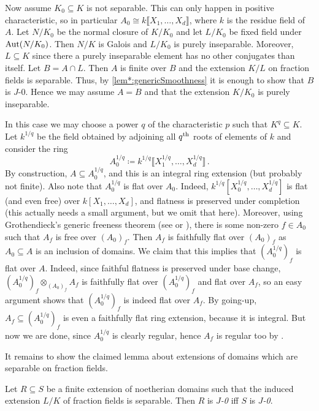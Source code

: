 \begin{proof*}
	Now assume $K_0\subseteq K$ is not separable. This can only happen in positive characteristic, so in particular $A_0\cong k\llbracket X_1,\dotsc,X_d\rrbracket$, where $k$ is the residue field of $A$. Let $N/K_0$ be the normal closure of $K/K_0$ and let $L/K_0$ be fixed field under $\operatorname{Aut}(N/K_0)$. Then $N/K$ is Galois and $L/K_0$ is purely inseparable. Moreover, $L\subseteq K$ since there a purely inseparable element has no other conjugates than itself. Let $B=A\cap L$. Then $A$ is finite over $B$ and the extension $K/L$ on fraction fields is separable. Thus, by \cref{lem*:genericSmoothness} it is enough to show that $B$ is $J$-0. Hence we may assume $A=B$ and that the extension $K/K_0$ is purely inseparable.
	
	In this case we may choose a power $q$ of the characteristic $p$ such that $K^q\subseteq K$. Let $k^{1/q}$ be the field obtained by adjoining all $q^{\text{th}}$ roots of elements of $k$ and consider the ring
	\begin{equation*}
	A_0^{1/q}\coloneqq k^{1/q}\big\llbracket X_1^{1/q},\dotsc,X_d^{1/q}\big\rrbracket\,.
	\end{equation*}
	By construction, $A\subseteq A_0^{1/q}$, and this is an integral ring extension (but probably not finite). Also note that $A_0^{1/q}$ is flat over $A_0$. Indeed, $k^{1/q}[X_0^{1/q},\dotsc,X_d^{1/q}]$ is flat (and even free) over $k[X_1,\dotsc,X_d]$, and flatness is preserved under completion (this actually needs a small argument, but we omit that here). Moreover, using Grothendieck's generic freeness theorem (see  or \cite[Proposition~A.2.1]{jacobians}), there is some non-zero $f\in A_0$ such that $A_f$ is free over $(A_0)_f$. Then $A_f$ is faithfully flat over $(A_0)_f$ as $A_0\subseteq A$ is an inclusion of domains. We claim that this implies that $(A_0^{1/q})_f$ is flat over $A$. Indeed, since faithful flatness is preserved under base change, $(A_0^{1/q})_f\otimes_{(A_0)_f}A_f$ is faithfully flat over $(A_0^{1/q})_f$ and flat over $A_f$, so an easy argument shows that $(A_0^{1/q})_f$ is indeed flat over $A_f$. By going-up, $A_f\subseteq (A_0^{1/q})_f$ is even a faithfully flat ring extension, because it is integral. But now we are done, since $A_0^{1/q}$ is clearly regular, hence $A_f$ is regular too by .
\end{proof*}
It remains to show the claimed lemma about extensions of domains which are separable on fraction fields.
\begin{lem*}\label{lem*:genericSmoothness}
	Let $R\subseteq S$ be a finite extension of noetherian domains such that the induced extension $L/K$ of fraction fields is separable. Then $R$ is \emph{$J$-0} iff $S$ is \emph{$J$-0}.
\end{lem*}

